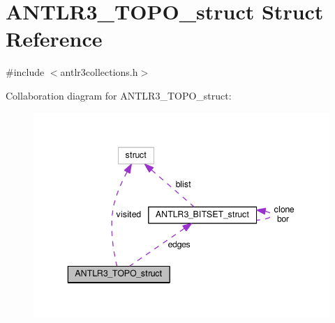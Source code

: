 \hypertarget{struct_a_n_t_l_r3___t_o_p_o__struct}{\section{A\-N\-T\-L\-R3\-\_\-\-T\-O\-P\-O\-\_\-struct Struct Reference}
\label{struct_a_n_t_l_r3___t_o_p_o__struct}
}


{\ttfamily \#include $<$antlr3collections.\-h$>$}



Collaboration diagram for A\-N\-T\-L\-R3\-\_\-\-T\-O\-P\-O\-\_\-struct\-:
\nopagebreak
\begin{figure}[H]
\begin{center}
\leavevmode
\includegraphics[width=343pt]{struct_a_n_t_l_r3___t_o_p_o__struct__coll__graph}
\end{center}
\end{figure}
